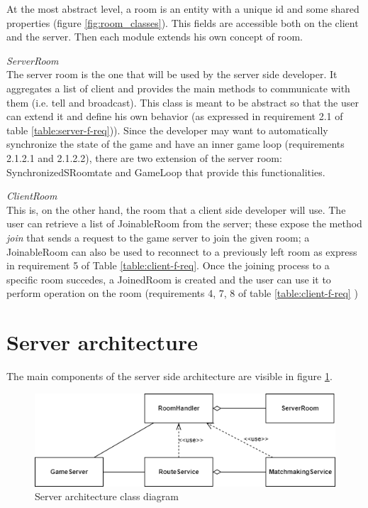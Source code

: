 At the most abstract level, a room is an entity with a unique id and some shared properties (figure \ref{fig:room_classes}). This fields are accessible both on the client and the server. Then each module extends his own concept of room.

\bigskip
\textit{ServerRoom}
\\
The server room is the one that will be used by the server side developer. It aggregates a list of client and provides the main methods to communicate with them (i.e. tell and broadcast).  This class is meant to be abstract so that the user can extend it and define his own behavior (as expressed in requirement 2.1 of table \ref{table:server-f-req})). Since the developer may want to automatically synchronize the state of the game and have an inner game loop (requirements 2.1.2.1 and 2.1.2.2), there are two extension of the server room: SynchronizedSRoomtate and GameLoop that provide this functionalities.

\bigskip
\textit{ClientRoom}
\\
This is, on the other hand, the room that a client side developer will use. The user can retrieve a list of JoinableRoom from the server; these expose the method \textit{join} that sends a request to the game server to join the given room; a JoinableRoom can also be used to reconnect to a previously left room as express in requirement 5 of Table \ref{table:client-f-req}. Once the joining process to a specific room succedes, a JoinedRoom is created and the user can use it to perform operation on the room (requirements 4, 7, 8 of table \ref{table:client-f-req} ) 

\section{Server architecture}
The main components of the server side architecture are visible in figure \ref{fig:server_classes}. 

\begin{figure}[H]
	\includegraphics[scale=0.7]{images/3-architecture/server_architecture-classes.png}
	\caption{Server architecture class diagram}
	\label{fig:server_classes}
\end{figure}

